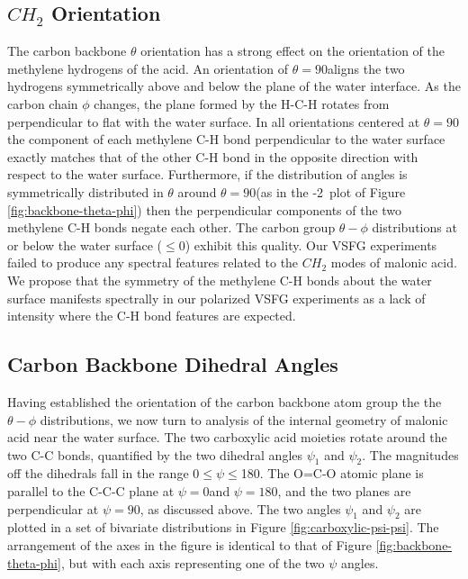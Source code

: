 \subsection {$CH_2$ Orientation}

The carbon backbone $\theta$ orientation has a strong effect on the orientation of the methylene hydrogens of the acid. An orientation of $\theta=90$\textdegree aligns the two hydrogens symmetrically above and below the plane of the water interface. As the carbon chain $\phi$ changes, the plane formed by the H-C-H rotates from perpendicular to flat with the water surface. In all orientations centered at $\theta=90$\textdegree the component of each methylene C-H bond perpendicular to the water surface exactly matches that of the other C-H bond in the opposite direction with respect to the water surface. Furthermore, if the distribution of angles is symmetrically distributed in $\theta$ around $\theta=90$\textdegree (as in the -2\angs~plot of Figure \ref{fig:backbone-theta-phi}) then the perpendicular components of the two methylene C-H bonds negate each other. The carbon group $\theta-\phi$ distributions at or below the water surface ($\le 0$\angs) exhibit this quality. Our VSFG experiments failed to produce any spectral features related to the $CH_2$ modes of malonic acid. We propose that the symmetry of the methylene C-H bonds about the water surface manifests spectrally in our polarized VSFG experiments as a lack of intensity where the C-H bond features are expected. 

\subsection {Carbon Backbone Dihedral Angles}

Having established the orientation of the carbon backbone atom group the the $\theta-\phi$ distributions, we now turn to analysis of the  internal geometry of malonic acid near the water surface. The two carboxylic acid moieties rotate around the two C-C bonds, quantified by the two dihedral angles $\psi_1$ and $\psi_2$. The magnitudes off the dihedrals fall in the range 0\textdegree$\le \psi \le$180\textdegree. The O=C-O atomic plane is parallel to the C-C-C plane at $\psi=0$\textdegree and $\psi=180$\textdegree, and the two planes are perpendicular at $\psi=90$\textdegree, as discussed above. The two angles $\psi_1$ and $\psi_2$ are plotted in a set of bivariate distributions in Figure \ref{fig:carboxylic-psi-psi}. The arrangement of the axes in the figure is identical to that of Figure \ref{fig:backbone-theta-phi}, but with each axis representing one of the two $\psi$ angles.


